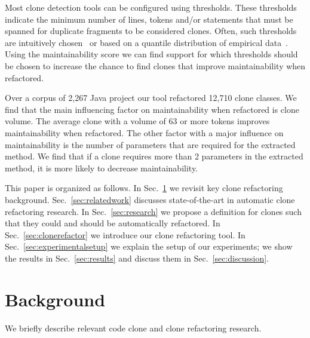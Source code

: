\documentclass[sigconf,review,anonymous]{acmart}
\begin{document}
Most clone detection tools can be configured using thresholds. These thresholds indicate the minimum number of lines, tokens and/or statements that must be spanned for duplicate fragments to be considered clones. Often, such thresholds are intuitively chosen~\cite{li2006cp, roy2009mutation} or based on a quantile distribution of empirical data~\cite{alves2010deriving}. Using the maintainability score we can find support for which thresholds should be chosen to increase the chance to find clones that improve maintainability when refactored.

Over a corpus of 2,267 Java project our tool refactored 12,710 clone classes. We find that the main influencing factor on maintainability when refactored is clone volume. %
The average clone with a volume of 63 or more tokens improves maintainability when refactored. The other factor with a major influence on maintainability is the number of parameters that are required for the extracted method. We find that if a clone requires more than 2 parameters in the extracted method, it is more likely to decrease maintainability.

This paper is organized as follows. In Sec.~\ref{sec:background} we revisit key clone refactoring background. Sec.~\ref{sec:relatedwork} discusses state-of-the-art in automatic clone refactoring research. In Sec.~\ref{sec:research} we propose a definition for clones such that they could and should be automatically refactored. In Sec.~\ref{sec:clonerefactor} we introduce our clone refactoring tool. In Sec.~\ref{sec:experimentalsetup} we explain the setup of our experiments; we show the results in Sec.~\ref{sec:results} and discuss them in Sec.~\ref{sec:discussion}.

\section{Background}\label{sec:background}
We briefly describe relevant code clone and clone refactoring research.
\end{document}
